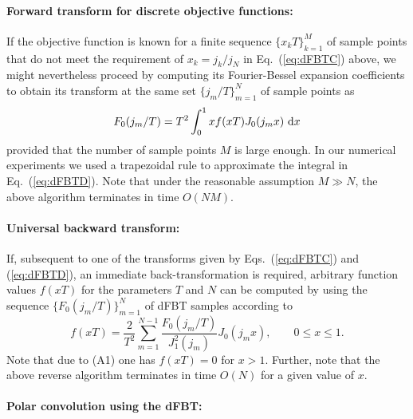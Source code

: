 \documentclass[12pt]{iopart}
\begin{document}
\paragraph{Forward transform for discrete objective functions:}

If the objective function is known for a finite sequence $\{x_k T\}_{k=1}^M$ of
sample points that do not meet the requirement of $x_k=j_k/j_N$ in
Eq.~(\ref{eq:dFBTC}) above, we might nevertheless proceed by computing its
Fourier-Bessel expansion coefficients to obtain its transform at the same set
$\{j_m/T\}_{m=1}^N$ of sample points as
\begin{equation}
F_0(j_m/T) = T^2 \int_0^1 x f(x T) J_0(j_m x)~{\rm{d}}x \label{eq:dFBTD}
\end{equation}
provided that the number of sample points $M$ is large enough. In our numerical
experiments we used a trapezoidal rule to approximate the integral in
Eq.~(\ref{eq:dFBTD}).
Note that under the reasonable assumption $M\gg N$, the above algorithm 
terminates in time $O(NM)$.

\paragraph{Universal backward transform:}

If, subsequent to one of the transforms given by Eqs.~(\ref{eq:dFBTC}) and 
(\ref{eq:dFBTD}), an immediate back-transformation is required, arbitrary 
function values $f(x T)$ for the parameters $T$ and $N$ can be computed by 
using the sequence $\{F_0(j_m/T)\}_{m=1}^N$ of dFBT samples
according to \cite{FiskJohnson:1987}
\begin{equation}
f(x T) = \frac{2}{T^2} \sum_{m=1}^{N-1} \frac{F_0(j_m/T)}{J_1^2(j_m)} J_0(j_m x), \qquad{0\leq x \leq 1}. \label{eq:dFBTRev}
\end{equation}
Note that due to (A1) one has $f(x T) = 0$ for $x>1$.
Further, note that the above reverse algorithm terminates in time $O(N)$ for
a given value of $x$.

\paragraph{Polar convolution using the dFBT:}
\end{document}
